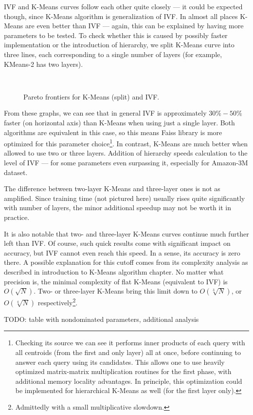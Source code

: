 IVF and K-Means curves follow each other quite closely --- it could be expected though,
since K-Means algorithm is generalization of IVF. In almost all places K-Means are even
better than IVF --- again, this can be explained by having more parameters to be tested.
To check whether this is caused by possibly faster implementation or the introduction of
hierarchy, we split K-Means curve into three lines, each corresponding to a single
number of layers (for example, KMeans-2 has two layers).

\begin{figure}[H]
	\centering
	\\
	\caption{Pareto frontiers for K-Means (split) and IVF.}
\end{figure}

From these graphs, we can see that in general IVF is approximately $30\% - 50\%$ faster
(on horizontal axis) than K-Means when using just a single layer. Both algorithms are 
equivalent in this case, so this means Faiss library is more optimized for this parameter 
choice\footnote{
Checking its source we can see it performs inner products of each query with all centroids
(from the first and only layer) all at once, before continuing to answer each query 
using its candidates. This allows one to use heavily optimized matrix-matrix multiplication
routines for the first phase, with additional memory locality advantages. 
In principle, this optimization
could be implemented for hierarchical K-Means as well (for the first layer only).
}.
In contrast, K-Means are much better when allowed to use two or three layers. Addition
of hierarchy speeds calculation to the level of IVF --- for some parameters even surpassing
it, especially for Amazon-3M dataset.

The difference between two-layer K-Means and three-layer ones is not as amplified. Since
training time (not pictured here) usually rises quite significantly with number of layers,
the minor additional speedup may not be worth it in practice.

It is also notable that two- and three-layer K-Means curves continue much further left
than IVF. Of course, such quick results come with significant impact on accuracy, but
IVF cannot even reach this speed. In a sense, its accuracy is zero there.
A possible explanation for this cutoff comes from its complexity analysis as described
in introduction to K-Means algorithm chapter. No matter what precision is, the minimal
complexity of flat K-Means (equivalent to IVF) is $O(\sqrt{N})$. Two- or three-layer
K-Means bring this limit down to $O(\sqrt[3]{N})$, or $O(\sqrt[4]{N})$ 
respectively\footnote{Admittedly with a small multiplicative slowdown.}.

TODO: table with nondominated parameters, additional analysis



